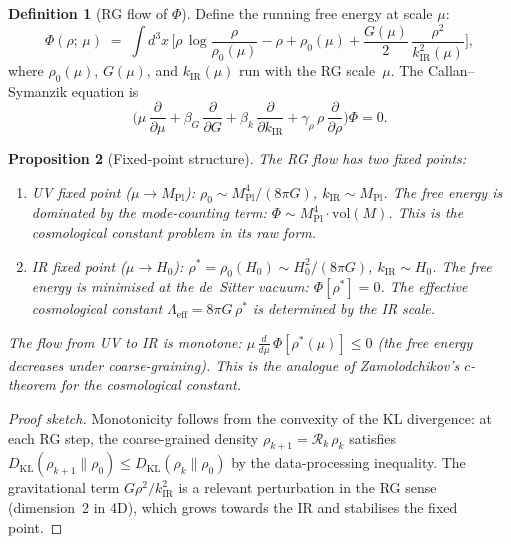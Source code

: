 \documentclass[12pt,a4paper]{article}
\theoremstyle{definition}
\newtheorem{definition}{Definition}[section]
\theoremstyle{plain}
\newtheorem{proposition}[definition]{Proposition}
\theoremstyle{remark}
\begin{document}
\begin{definition}[RG flow of $\Phi$]
\label{def:rg-flow-phi}
Define the running free energy at scale $\mu$:
\[
  \Phi(\rho;\,\mu)
  \;=\;
  \int d^{3}x\,\biggl[
    \rho\,\log\frac{\rho}{\rho_{0}(\mu)}
    - \rho + \rho_{0}(\mu)
    + \frac{G(\mu)}{2}\,\frac{\rho^{2}}{k_{\mathrm{IR}}^{2}(\mu)}
  \biggr],
\]
where $\rho_{0}(\mu)$, $G(\mu)$, and $k_{\mathrm{IR}}(\mu)$ run with
the RG scale~$\mu$.  The Callan--Symanzik equation is
\[
  \biggl(
    \mu\,\frac{\partial}{\partial\mu}
    + \beta_{G}\,\frac{\partial}{\partial G}
    + \beta_{k}\,\frac{\partial}{\partial k_{\mathrm{IR}}}
    + \gamma_{\rho}\,\rho\,\frac{\partial}{\partial\rho}
  \biggr)\Phi = 0.
\]
\end{definition}

\begin{proposition}[Fixed-point structure]
\label{prop:rg-fixed-points}
The RG flow has two fixed points:
\begin{enumerate}
\item \emph{UV fixed point} ($\mu \to M_{\mathrm{Pl}}$):
  $\rho_{0} \sim M_{\mathrm{Pl}}^{4}/(8\pi G)$,
  $k_{\mathrm{IR}} \sim M_{\mathrm{Pl}}$.
  The free energy is dominated by the mode-counting term:
  $\Phi \sim M_{\mathrm{Pl}}^{4}\cdot\mathrm{vol}(M)$.
  This is the cosmological constant problem in its raw form.
\item \emph{IR fixed point} ($\mu \to H_{0}$):
  $\rho^{*} = \rho_{0}(H_{0}) \sim H_{0}^{2}/(8\pi G)$,
  $k_{\mathrm{IR}} \sim H_{0}$.
  The free energy is minimised at the de~Sitter vacuum:
  $\Phi[\rho^{*}] = 0$.
  The effective cosmological constant
  $\Lambda_{\mathrm{eff}} = 8\pi G\,\rho^{*}$ is determined by the
  IR scale.
\end{enumerate}
The flow from UV to IR is monotone:
$\mu\,\frac{d}{d\mu}\,\Phi[\rho^{*}(\mu)] \leq 0$
(the free energy decreases under coarse-graining).
This is the analogue of Zamolodchikov's $c$-theorem for the
cosmological constant.
\end{proposition}

\begin{proof}[Proof sketch]
Monotonicity follows from the convexity of the KL divergence: at each
RG step, the coarse-grained density
$\rho_{k+1} = \mathcal{R}_{k}\,\rho_{k}$ satisfies
$D_{\mathrm{KL}}(\rho_{k+1}\|\rho_{0})
 \leq D_{\mathrm{KL}}(\rho_{k}\|\rho_{0})$
by the data-processing inequality.  The gravitational term
$G\rho^{2}/k_{\mathrm{IR}}^{2}$ is a relevant perturbation in the RG
sense (dimension~2 in 4D), which grows towards the IR and stabilises
the fixed point.
\end{proof}
\end{document}

